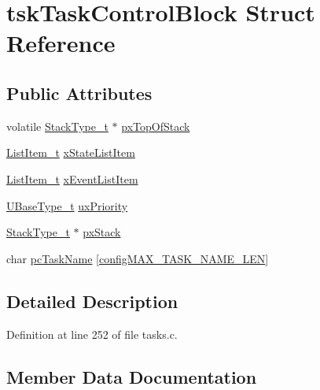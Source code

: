 \hypertarget{structtskTaskControlBlock}{}\section{tsk\+Task\+Control\+Block Struct Reference}
\label{structtskTaskControlBlock}
\subsection*{Public Attributes}
\begin{DoxyCompactItemize}
\item 
volatile \hyperlink{pic32mx_2portmacro_8h_a84e9a8ba132feed0b2401c1f4e2ac63c}{Stack\+Type\+\_\+t} $\ast$ \hyperlink{structtskTaskControlBlock_a429a186c7f8e34aba1eef5e12d215b90}{px\+Top\+Of\+Stack}
\item 
\hyperlink{list_8h_a1a62d469392f9bfe2443e7efab9c8398}{List\+Item\+\_\+t} \hyperlink{structtskTaskControlBlock_a16e0d20425d53ac78537e1fdb8834cf6}{x\+State\+List\+Item}
\item 
\hyperlink{list_8h_a1a62d469392f9bfe2443e7efab9c8398}{List\+Item\+\_\+t} \hyperlink{structtskTaskControlBlock_a1a1612b6081a13683808284d93a9b28f}{x\+Event\+List\+Item}
\item 
\hyperlink{pic32mx_2portmacro_8h_a646f89d4298e4f5afd522202b11cb2e6}{U\+Base\+Type\+\_\+t} \hyperlink{structtskTaskControlBlock_a79187811e3d2a15595942e3b44237d85}{ux\+Priority}
\item 
\hyperlink{pic32mx_2portmacro_8h_a84e9a8ba132feed0b2401c1f4e2ac63c}{Stack\+Type\+\_\+t} $\ast$ \hyperlink{structtskTaskControlBlock_a9a0d71a9f95dd0609f9911d9efd79134}{px\+Stack}
\item 
char \hyperlink{structtskTaskControlBlock_a67d61291794f38afb5be5132078bc24f}{pc\+Task\+Name} \mbox{[}\hyperlink{FreeRTOS_8h_ac388dc4041aab6997348828eb27fc1a8}{config\+M\+A\+X\+\_\+\+T\+A\+S\+K\+\_\+\+N\+A\+M\+E\+\_\+\+L\+EN}\mbox{]}
\end{DoxyCompactItemize}


\subsection{Detailed Description}


Definition at line 252 of file tasks.\+c.



\subsection{Member Data Documentation}
\mbox{\label{structtskTaskControlBlock_a67d61291794f38afb5be5132078bc24f}} 
